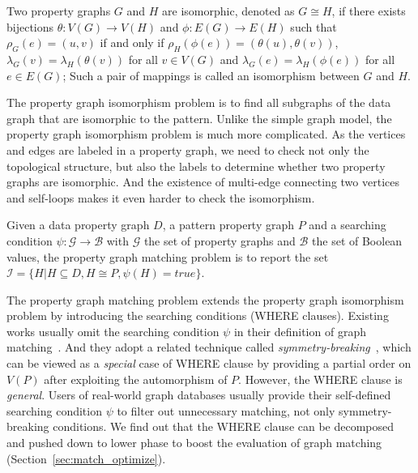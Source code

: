 \begin{definition}
  Two property graphs $G$ and $H$ are isomorphic, denoted as $G \cong H$,
  if there exists bijections $\theta: V(G) \rightarrow V(H)$ and $\phi: E(G) \rightarrow E(H)$ such that
  $\rho_G(e) = (u, v)$ if and only if $\rho_H(\phi(e)) = (\theta(u), \theta(v))$,
  $\lambda_G(v) = \lambda_H(\theta(v))$ for all $v \in V(G)$
  and $\lambda_G(e) = \lambda_H(\phi(e))$ for all $e \in E(G)$;
  Such a pair of mappings is called an isomorphism between $G$ and $H$.
\end{definition}
The property graph isomorphism problem is to find all subgraphs of the data graph that are isomorphic to the pattern.
Unlike the simple graph model, the property graph isomorphism problem is much more complicated.
As the vertices and edges are labeled in a property graph, we need to check  not only the topological structure,
but also the labels to determine whether two property graphs are isomorphic.
And the existence of multi-edge connecting two vertices and self-loops makes it even harder to check the isomorphism.
\begin{definition}\label{def:property_graph_matching}
  Given a data property graph $D$, a pattern property graph $P$ and a searching condition $\psi: \mathcal{G} \rightarrow \mathcal{B}$ with $\mathcal{G}$ the set of property graphs and $\mathcal{B}$ the set of Boolean values,
  the property graph matching problem is to report the set $\mathcal{I} = \{H | H \subseteq D, H \cong P, \psi(H) = true\}$.
\end{definition}
The property graph matching problem extends the property graph isomorphism problem by introducing the searching conditions (WHERE clauses).
Existing works usually omit the searching condition $\psi$ in their definition of graph matching~\cite{DBLP:conf/sigmod/ShaoCCMYX14,DBLP:journals/pvldb/LaiQLC15,DBLP:conf/sigmod/KimLBHLKJ16,DBLP:journals/pvldb/QiaoZC17}.
And they adopt a related technique called \emph{symmetry-breaking}~\cite{DBLP:conf/recomb/GrochowK07},
which can be viewed as a \emph{special} case of WHERE clause by providing a partial order on $V(P)$ after exploiting the automorphism of $P$.
However, the WHERE clause is \emph{general}. Users of real-world graph databases usually provide their self-defined searching condition $\psi$ to filter out unnecessary matching, not only symmetry-breaking conditions.
We find out that the WHERE clause can be decomposed and pushed down to lower phase to boost the evaluation of graph matching (Section~\ref{sec:match_optimize}).
